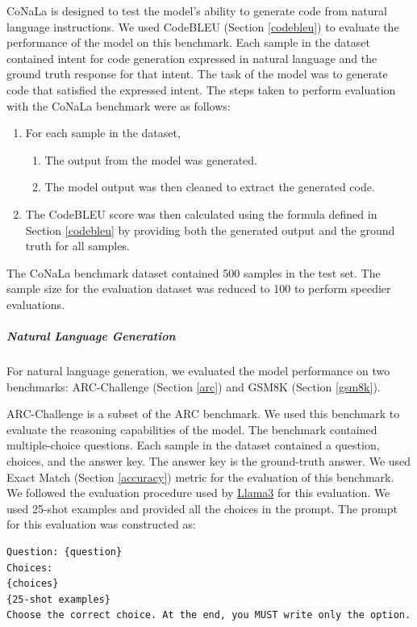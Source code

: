 CoNaLa is designed to test the model’s ability to generate code from natural language instructions. We used CodeBLEU (Section \ref{codebleu}) to evaluate the performance of the model on this benchmark. Each sample in the dataset contained intent for code generation expressed in natural language and the ground truth response for that intent. The task of the model was to generate code that satisfied the expressed intent. The steps taken to perform evaluation with the CoNaLa benchmark were as follows:
\begin{enumerate}
\item For each sample in the dataset,
\begin{enumerate} [label*=\arabic*.]
\item The output from the model was generated.
\item The model output was then cleaned to extract the generated code.
\end{enumerate}
\item The CodeBLEU score was then calculated using the formula defined in Section \ref{codebleu} by providing both the generated output and the ground truth for all samples.
\end{enumerate}

The CoNaLa benchmark dataset contained 500 samples in the test set. The sample size for the evaluation dataset was reduced to 100 to perform speedier evaluations.

\subparagraph{Natural Language Generation}
For natural language generation, we evaluated the model performance on two benchmarks: ARC-Challenge (Section \ref{arc}) and GSM8K (Section \ref{gsm8k}). 

ARC-Challenge is a subset of the ARC benchmark. We used this benchmark to evaluate the reasoning capabilities of the model. The benchmark contained multiple-choice questions. Each sample in the dataset contained a question, choices, and the answer key. The answer key is the ground-truth answer. We used Exact Match (Section \ref{accuracy}) metric for the evaluation of this benchmark. We followed the evaluation procedure used by \href{https://github.com/meta-llama/llama3/blob/main/eval\_details.md}{Llama3} for this evaluation. 
We used 25-shot examples and provided all the choices in the prompt. The prompt for this evaluation was constructed as:
\begin{lstlisting}
Question: {question}
Choices:
{choices}
{25-shot examples}
Choose the correct choice. At the end, you MUST write only the option.
\end{lstlisting}

